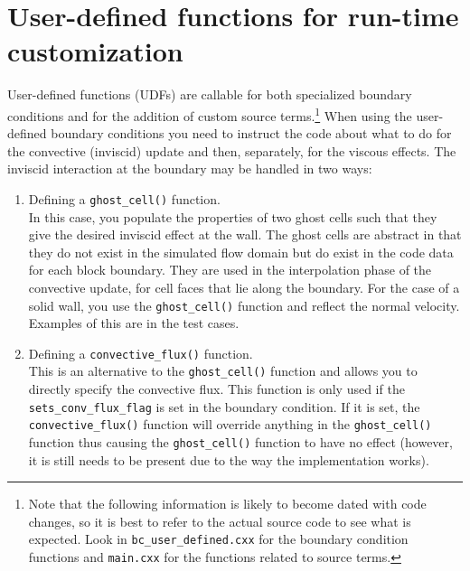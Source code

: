 \section{User-defined functions for run-time customization}
\label{udf-sec}
User-defined functions (UDFs) are callable for both specialized boundary conditions and 
for the addition of custom source terms.\footnote{Note that the following information 
is likely to become dated with code changes,
so it is best to refer to the actual source code to see what is expected.
Look in \texttt{bc\_user\_defined.cxx} for the boundary condition functions and \texttt{main.cxx} for the 
functions related to source terms.}
When using the user-defined boundary conditions you need to instruct the code about 
what to do for the convective (inviscid) update and then, separately, for the viscous effects. 
The inviscid interaction at the boundary may be handled in two ways:
\begin{enumerate}
 \item Defining a \verb!ghost_cell()! function.\\
  In this case, you populate the properties of two ghost cells such that 
  they give the desired inviscid effect at the wall. 
  The ghost cells are abstract in that they do not exist in the simulated flow domain
  but do exist in the code data for each block boundary. 
  They are used in the interpolation phase of the convective update,
  for cell faces that lie along the boundary.
  For the case of a solid wall, you use the \verb!ghost_cell()! function 
  and reflect the normal velocity.
  Examples of this are in the test cases.
 \item Defining a \verb!convective_flux()! function. \\
  This is an alternative to the \verb!ghost_cell()! function and
  allows you to directly specify the convective flux. 
  This function is only used if the \verb!sets_conv_flux_flag! is set in the boundary condition. 
  If it is set, the \verb!convective_flux()! function will override anything in the \verb!ghost_cell()! function
  thus causing the \verb!ghost_cell()! function to have no effect (however, it is still needs to be present due to the
  way the implementation works).
\end{enumerate}

